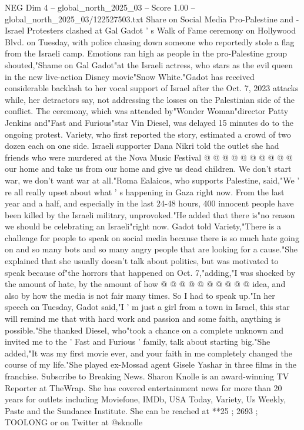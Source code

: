 \begin{textsample}{NEG Dim 4 – global\_north\_2025\_03 – Score 1.00 – global\_north\_2025\_03/122527503.txt}  \label{ex:f4_neg_399}
Share on Social Media Pro-Palestine and -Israel Protesters clashed at Gal Gadot ' s Walk of Fame ceremony on Hollywood Blvd. on Tuesday, with police chasing down someone who reportedly stole a flag from the Israeli camp.
Emotions ran high as people in the pro-Palestine group shouted,"Shame on Gal Gadot"at the Israeli actress, who stars as the evil queen in the new live-action Disney movie"Snow White."Gadot has received considerable backlash to her vocal support of Israel after the Oct. 7, 2023 attacks while, her detractors say, not addressing the losses on the Palestinian side of the conflict.
The ceremony, which was attended by"Wonder Woman"director Patty Jenkins and"Fast and Furious"star Vin Diesel, was delayed 15 minutes do to the ongoing protest.
Variety, who first reported the story, estimated a crowd of two dozen each on one side.
Israeli supporter Dana Nikri told the outlet she had friends who were murdered at the Nova Music Festival @ @ @ @ @ @ @ @ @ @ our home and take us from our home and give us dead children.
We don't start war, we don't want war at all."Roma Ealaicos, who supports Palestine, said,"We ' re all really upset about what ' s happening in Gaza right now.
From the last year and a half, and especially in the last 24-48 hours, 400 innocent people have been killed by the Israeli military, unprovoked."He added that there is"no reason we should be celebrating an Israeli"right now.
Gadot told Variety,"There is a challenge for people to speak on social media because there is so much hate going on and so many bots and so many angry people that are looking for a cause."She explained that she usually doesn't talk about politics, but was motivated to speak because of"the horrors that happened on Oct. 7,"adding,"I was shocked by the amount of hate, by the amount of how @ @ @ @ @ @ @ @ @ @ idea, and also by how the media is not fair many times.
So I had to speak up."In her speech on Tuesday, Gadot said,"I ' m just a girl from a town in Israel, this star will remind me that with hard work and passion and some faith, anything is possible."She thanked Diesel, who"took a chance on a complete unknown and invited me to the ' Fast and Furious ' family, talk about starting big."She added,"It was my first movie ever, and your faith in me completely changed the course of my life."She played ex-Mossad agent Gisele Yashar in three films in the franchise.
Subscribe to Breaking News.
Sharon Knolle is an award-winning TV Reporter at TheWrap.
She has covered entertainment news for more than 20 years for outlets including Moviefone, IMDb, USA Today, Variety, Us Weekly, Paste and the Sundance Institute.
She can be reached at **25 ; 2693 ; TOOLONG or on Twitter at @sknolle

\end{textsample}
